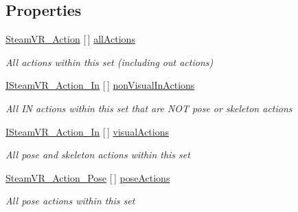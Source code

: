 \subsection*{Properties}
\begin{DoxyCompactItemize}
\item 
\mbox{\hyperlink{class_valve_1_1_v_r_1_1_steam_v_r___action}{Steam\+V\+R\+\_\+\+Action}} \mbox{[}$\,$\mbox{]} \mbox{\hyperlink{interface_valve_1_1_v_r_1_1_i_steam_v_r___action_set_a0156b374bb4e45998710402d0f26e7c4}{all\+Actions}}
\begin{DoxyCompactList}\small\item\em All actions within this set (including out actions) \end{DoxyCompactList}\item 
\mbox{\hyperlink{interface_valve_1_1_v_r_1_1_i_steam_v_r___action___in}{I\+Steam\+V\+R\+\_\+\+Action\+\_\+\+In}} \mbox{[}$\,$\mbox{]} \mbox{\hyperlink{interface_valve_1_1_v_r_1_1_i_steam_v_r___action_set_a49ce18ae625e4d1677f3069d028a8445}{non\+Visual\+In\+Actions}}
\begin{DoxyCompactList}\small\item\em All IN actions within this set that are N\+OT pose or skeleton actions \end{DoxyCompactList}\item 
\mbox{\hyperlink{interface_valve_1_1_v_r_1_1_i_steam_v_r___action___in}{I\+Steam\+V\+R\+\_\+\+Action\+\_\+\+In}} \mbox{[}$\,$\mbox{]} \mbox{\hyperlink{interface_valve_1_1_v_r_1_1_i_steam_v_r___action_set_a2016acc2f64a6a292126fe2b33ac928d}{visual\+Actions}}
\begin{DoxyCompactList}\small\item\em All pose and skeleton actions within this set \end{DoxyCompactList}\item 
\mbox{\hyperlink{class_valve_1_1_v_r_1_1_steam_v_r___action___pose}{Steam\+V\+R\+\_\+\+Action\+\_\+\+Pose}} \mbox{[}$\,$\mbox{]} \mbox{\hyperlink{interface_valve_1_1_v_r_1_1_i_steam_v_r___action_set_afe532a646e044a3594d5e23485612077}{pose\+Actions}}
\begin{DoxyCompactList}\small\item\em All pose actions within this set \end{DoxyCompactList}\item 

\end{DoxyCompactItemize}
